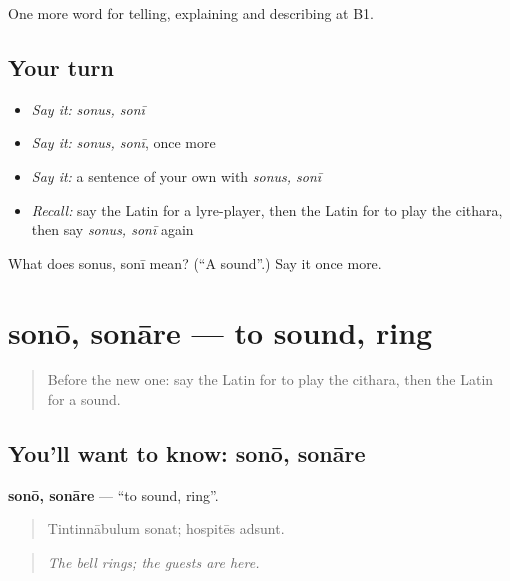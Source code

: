 \begin{grammarlens}[title={What you've built}]
One more word for telling, explaining and describing at B1.
\end{grammarlens}

\subsection*{Your turn}
\begin{itemize}
\raggedright
  \item \emph{Say it:} \emph{sonus, sonī}
  \item \emph{Say it:} \emph{sonus, sonī}, once more
  \item \emph{Say it:} a sentence of your own with \emph{sonus, sonī}
  \item \emph{Recall:} say the Latin for a lyre-player, then the Latin for to play the cithara, then say \emph{sonus, sonī} again
\end{itemize}

\begin{tcolorbox}[breakable,colback=teal!4,colframe=teal!35!black,title={Before you move on}]
What does sonus, sonī mean? (\textquotedblleft{}A sound\textquotedblright{}.) Say it once more.
\end{tcolorbox}
\section[sonō, sonāre]{sonō, sonāre — to sound, ring}

\label{lesson:LA-C545-sono}



\begin{quote}
Before the new one: say the Latin for to play the cithara, then the Latin for a sound.
\end{quote}

\subsection*{You'll want to know: sonō, sonāre}
\textbf{sonō, sonāre} — \textquotedblleft{}to sound, ring\textquotedblright{}.

\begin{quote}
Tintinnābulum sonat; hospitēs adsunt.
\end{quote}

\begin{quote}
\emph{The bell rings; the guests are here.}
\end{quote}

